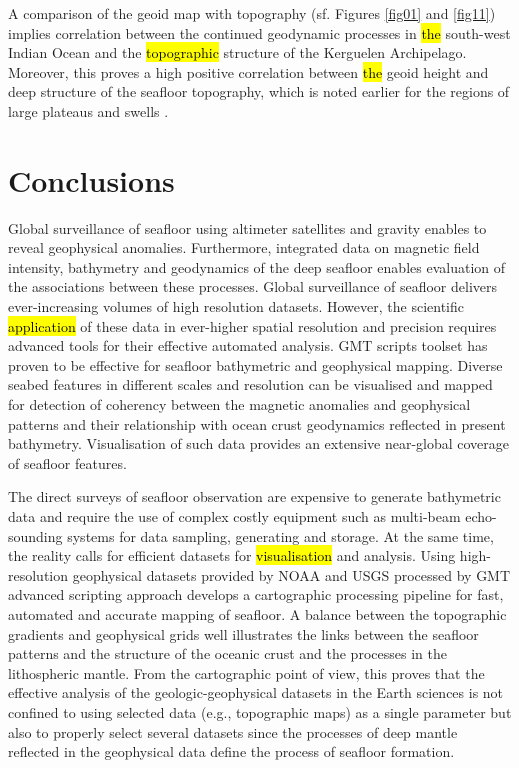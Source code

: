 \documentclass[geomatics,article,submit,pdftex,moreauthors]{Definitions/mdpi}
\begin{document}
A comparison of the geoid map with topography (sf. Figures \ref{fig01} and \ref{fig11}) implies correlation between the continued geodynamic processes in \hl{the }south-west Indian Ocean and the \hl{topographic} structure of the Kerguelen Archipelago. Moreover, this proves a high positive correlation between \hl{the }geoid height and deep structure of the seafloor topography, which is noted earlier for the regions of large plateaus and swells \cite{SandwellMacKenzie}. 

\section{Conclusions}

Global surveillance of seafloor using altimeter satellites and gravity enables to reveal geophysical anomalies. Furthermore, integrated data on magnetic field intensity, bathymetry and geodynamics of the deep seafloor enables evaluation of the associations between these processes. Global surveillance of seafloor delivers ever-increasing volumes of high resolution datasets. However, the scientific \hl{application} of these data in ever-higher spatial resolution and precision requires advanced tools  for their effective automated analysis. GMT scripts toolset has proven to be effective for seafloor bathymetric and geophysical mapping. Diverse seabed features in different scales and resolution can be visualised and mapped for detection of coherency between the magnetic anomalies and geophysical patterns and their relationship with ocean crust geodynamics reflected in present bathymetry. Visualisation of such data provides an extensive near-global coverage of seafloor features. 

The direct surveys of seafloor observation are expensive to generate bathymetric data and require the use of complex costly equipment such as multi-beam echo-sounding systems for data sampling, generating and storage. At the same time, the reality calls for efficient datasets for \hl{visualisation} and analysis. Using high-resolution geophysical datasets provided by NOAA and USGS processed by GMT advanced scripting approach develops a cartographic processing pipeline for fast, automated and accurate mapping of seafloor. A balance between the topographic gradients and geophysical grids well illustrates the links between the seafloor patterns and the structure of the oceanic crust and the processes in the lithospheric mantle. From the cartographic point of view, this proves that the effective analysis of the geologic-geophysical datasets in the Earth sciences is not confined to using selected data (e.g., topographic maps) as a single parameter but also to properly select several datasets since the processes of deep mantle reflected in the geophysical data define the process of seafloor formation. 
\end{document}
